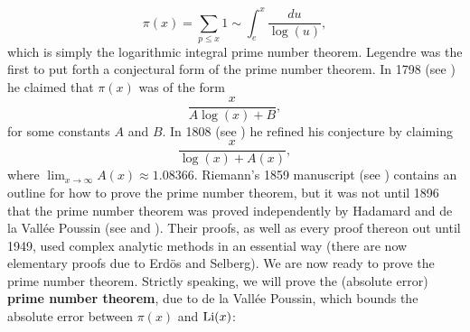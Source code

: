     \[
      \pi(x) = \sum_{p \le x}1 \sim \int_{e}^{x}\frac{du}{\log(u)},
    \]
    which is simply the logarithmic integral prime number theorem. Legendre was the first to put forth a conjectural form of the prime number theorem. In 1798 (see \cite{legendre1798essai}) he claimed that $\pi(x)$ was of the form
    \[
      \frac{x}{A\log(x)+B},
    \]
    for some constants $A$ and $B$. In 1808 (see \cite{legendre1808essai}) he refined his conjecture by claiming
    \[
      \frac{x}{\log(x)+A(x)},
    \]
    where $\lim_{x \to \infty}A(x) \approx 1.08366$. Riemann's 1859 manuscript (see \cite{riemann1859ueber}) contains an outline for how to prove the prime number theorem, but it was not until 1896 that the prime number theorem was proved independently by Hadamard and de la Vall\'ee Poussin (see \cite{hadamard1896distribution} and \cite{poussin1897recherches}). Their proofs, as well as every proof thereon out until 1949, used complex analytic methods in an essential way (there are now elementary proofs due to Erd\"os and Selberg). We are now ready to prove the prime number theorem. Strictly speaking, we will prove the (absolute error) \textbf{prime number theorem}, due to de la Vall\'ee Poussin, which bounds the absolute error between $\pi(x)$ and $\operatorname{\mathrm{Li}}(x)$:

